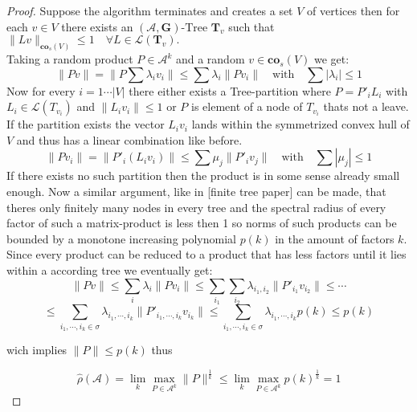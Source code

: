 \begin{proof}
Suppose the algorithm terminates and creates a set $V$ of vertices then for each $v \in V$ there exists an $(\mathcal{A},\mathbf{G})\text{-Tree } \mathbf{T}_{v}$ such that $\lVert Lv \rVert_{\mathbf{co}_s (V)} \leq 1 \quad \forall L \in \mathcal{L}(\mathbf{T}_{v}).$ \\
Taking a random product $P \in \mathcal{A}^k$ and a random $v \in \mathbf{co}_s(V)$
we get:
$$\lVert Pv \rVert = \lVert P \sum \lambda_i v_i \rVert \leq \sum \lambda_i \lVert P v_i \rVert \quad \text{with} \quad \sum |\lambda_i| \leq 1$$
Now for every $i = 1 \cdots \lvert V \rvert$ there either exists a Tree-partition where $P = P'_i L_i $ with $L_i \in \mathcal{L}(T_{v_i})$ and $\lVert L_i v_i \rVert \leq 1$ or $P$ is element of a node of $T_{v_i}$ thats not a leave. If the partition exists the vector $L_iv_i$ lands within the symmetrized convex hull of $V$ and thus has a linear combination like before. \\
$$ \lVert P v_i \rVert = \lVert P'_i (L_i v_i) \rVert \leq \sum \mu_j \lVert P'_i v_j \rVert \quad \text{with} \quad \sum |\mu_j| \leq 1 $$
If there exists no such partition then the product is in some sense already small enough. Now a similar argument, like in [finite tree paper] can be made, that theres only finitely many nodes in every tree and the spectral radius of every factor of such a matrix-product is less then 1 so norms of such products can be bounded by a monotone increasing polynomial $p(k)$ in the amount of factors $k$. \\
Since every product can be reduced to a product that has less factors until it lies within a according tree we eventually get:
$$ \lVert Pv \rVert \leq \sum \limits_{i} \lambda_i \lVert P v_i \rVert \leq \sum\limits_{i_1}\sum\limits_{i_2}\lambda_{i_1,i_2} \lVert P'_{i_1} v_{i_2} \rVert \leq \cdots $$
$$  \leq \sum \limits_{i_1,\cdots,i_k \in \sigma} \lambda_{i_1,\cdots,i_k} \lVert P'_{i_1,\cdots,i_k}v_{i_k} \rVert \leq \sum \limits_{i_1,\cdots,i_k \in \sigma} \lambda_{i_1,\cdots,i_k} p(k) \leq p(k)$$

wich implies $\lVert P \rVert \leq p(k)$ thus

$$\hat{\rho}(\mathcal{A}) = \lim_k \max_{P \in \mathcal{A}^k} \lVert P \rVert ^{\frac{1}{k}} \leq \lim_k \max_{P \in \mathcal{A}^k} p(k) ^{\frac{1}{k}}  = 1$$
\end{proof}

